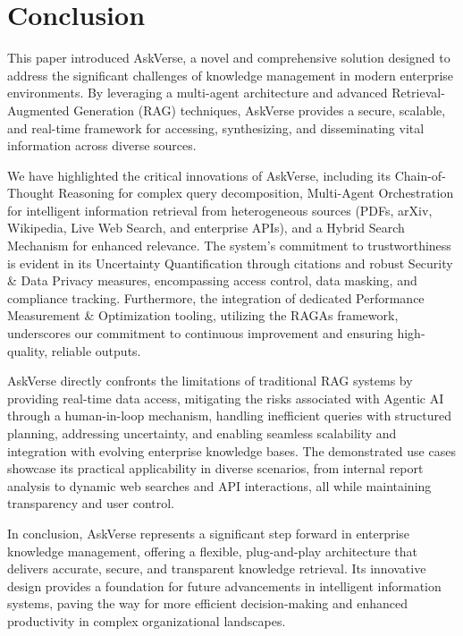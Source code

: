 \documentclass[default]{sn-jnl}%
\begin{document}

\section*{Conclusion}
This paper introduced AskVerse, a novel and comprehensive solution designed to address the significant challenges of knowledge management in modern enterprise environments. By leveraging a multi-agent architecture and advanced Retrieval-Augmented Generation (RAG) techniques, AskVerse provides a secure, scalable, and real-time framework for accessing, synthesizing, and disseminating vital information across diverse sources.

We have highlighted the critical innovations of AskVerse, including its Chain-of-Thought Reasoning for complex query decomposition, Multi-Agent Orchestration for intelligent information retrieval from heterogeneous sources (PDFs, arXiv, Wikipedia, Live Web Search, and enterprise APIs), and a Hybrid Search Mechanism for enhanced relevance. The system's commitment to trustworthiness is evident in its Uncertainty Quantification through citations and robust Security \& Data Privacy measures, encompassing access control, data masking, and compliance tracking. Furthermore, the integration of dedicated Performance Measurement \& Optimization tooling, utilizing the RAGAs framework, underscores our commitment to continuous improvement and ensuring high-quality, reliable outputs.

AskVerse directly confronts the limitations of traditional RAG systems by providing real-time data access, mitigating the risks associated with Agentic AI through a human-in-loop mechanism, handling inefficient queries with structured planning, addressing uncertainty, and enabling seamless scalability and integration with evolving enterprise knowledge bases. The demonstrated use cases showcase its practical applicability in diverse scenarios, from internal report analysis to dynamic web searches and API interactions, all while maintaining transparency and user control.

In conclusion, AskVerse represents a significant step forward in enterprise knowledge management, offering a flexible, plug-and-play architecture that delivers accurate, secure, and transparent knowledge retrieval. Its innovative design provides a foundation for future advancements in intelligent information systems, paving the way for more efficient decision-making and enhanced productivity in complex organizational landscapes.
\end{document}

